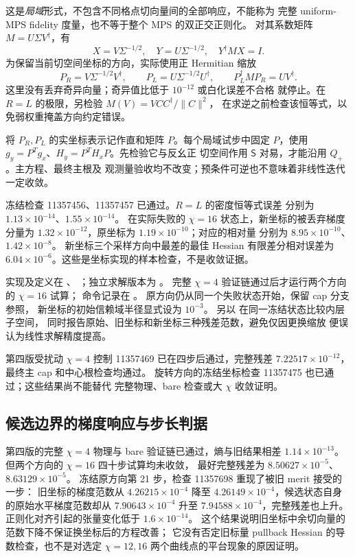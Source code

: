 这是\emph{局域}形式，不包含不同格点切向量间的全部响应，不能称为
完整 uniform-MPS fidelity 度量，也不等于整个 MPS 的双正交正则化。
对其系数矩阵 $M=U\Sigma V^\dagger$，有
\begin{equation}
 X=V\Sigma^{-1/2},\quad Y=U\Sigma^{-1/2},\quad Y^\dagger M X=I.
\end{equation}
为保留当前切空间坐标的方向，实际使用正 Hermitian 缩放
\begin{equation}
 P_R=V\Sigma^{-1/2}V^\dagger,\qquad
 P_L=U\Sigma^{-1/2}U^\dagger,\qquad
 P_L^\dagger M P_R=UV^\dagger.
\end{equation}
这里没有丢弃奇异向量；奇异值比低于 $10^{-12}$ 或白化误差不合格
就停止。在 $R=L$ 的极限，另检验 $M(V)=VCC^\dagger/\|C\|^2$，
在求逆之前检查该恒等式，以免弱权重掩盖方向约定错误。

将 $P_R,P_L$ 的实坐标表示记作直和矩阵 $P$。每个局域试步中固定
$P$，使用 $g_y=P^Tg_x$、$H_y=P^TH_xP$。先检验它与反幺正
切空间作用 $\mathsf S$ 对易，才能沿用 $Q_+$。主方程、最终主根及
观测量验收均不改变；预条件可逆也不意味着非线性迭代一定收敛。

冻结检查 11357456、11357457 已通过。$R=L$ 的密度恒等式误差
分别为 $1.13\times10^{-14}$、$1.55\times10^{-14}$。
在实际失败的 $\chi=16$ 状态上，新坐标的被丢弃梯度分量为
$1.32\times10^{-12}$，原坐标为 $1.19\times10^{-10}$；对应的相对量
分别为 $8.95\times10^{-10}$、$1.42\times10^{-8}$。
新坐标三个采样方向中最差的最佳 Hessian 有限差分相对误差为
$6.04\times10^{-6}$。这些是坐标实现的样本检查，不是收敛证据。

实现及定义在 、
；独立求解版本为
。
完整 $\chi=4$ 验证链通过后才运行两个方向的 $\chi=16$ 试算；
命令记录在 。
原方向仍从同一个失败状态开始，保留 cap 分支参照，
新坐标的初始信赖域半径显式设为 $10^{-3}$。
另以  在同一冻结状态比较内层子空间，
同时报告原始、旧坐标和新坐标三种残差范数，避免仅因更换缩放
便误认为线性求解精度提高。

第四版受扰动 $\chi=4$ 控制 11357469 已在四步后通过，完整残差
$7.22517\times10^{-12}$，最终主 cap 和中心根检查均通过。
旋转方向的冻结坐标检查 11357475 也已通过；这些结果尚不能替代
完整物理、bare 检查或大 $\chi$ 收敛证明。

\subsection{候选边界的梯度响应与步长判据}
第四版的完整 $\chi=4$ 物理与 bare 验证链已通过，熵与旧结果相差
$1.14\times10^{-13}$。但两个方向的 $\chi=16$ 四十步试算均未收敛，
最好完整残差为 $8.50627\times10^{-5}$、$8.63129\times10^{-5}$。
冻结原方向第 21 步，检查 11357698 重现了被旧 merit 接受的一步：
旧坐标的梯度范数从 $4.26215\times10^{-4}$ 降至
$4.26149\times10^{-4}$，候选状态自身的原始水平梯度范数却从
$7.90643\times10^{-4}$ 升至 $7.94588\times10^{-4}$，完整残差也上升。
正则化对齐引起的张量变化低于 $1.6\times10^{-14}$。
这个结果说明旧坐标中余切向量的范数下降不保证换坐标后的方程改善；
它没有否定旧标量 pullback Hessian 的导数检查，也不是对选定
$\chi=12,16$ 两个曲线点的平台现象的原因证明。

